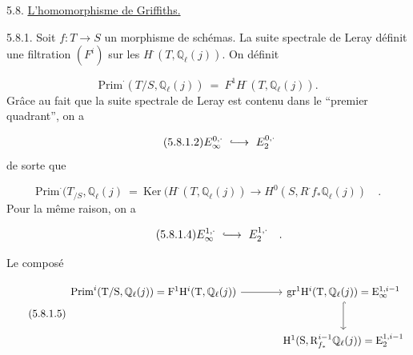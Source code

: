 5.8. \underline{L'homomorphisme de Griffiths.}

5.8.1. Soit $f: T \longrightarrow S$ un morphisme de schémas. La suite spectrale de Leray définit une filtration $(F^i)$ sur les $H^{\cdot}(T,\mathbb{Q}_\ell(j))$. On définit

\begin{equation}\tag{5.8.1.1}
\mathrm{Prim}^{\cdot}(T/S,\mathbb{Q}_\ell(j)) \ = \ F^1H^{\cdot}(T,\mathbb{Q}_\ell(j)).
\end{equation}
Grâce au fait que la suite spectrale de Leray est contenu dans le ``premier quadrant'', on a

\begin{equation}\tag{5.8.1.2}
E_\infty^{0,\cdot} \ \lhook\joinrel\longrightarrow \ E_2^{0,\cdot}
\end{equation}
de sorte que

\begin{equation}\tag{5.8.1.3}
\mathrm{Prim}^{\cdot}(T_{/S},\mathbb{Q}_\ell(j) \ = \ \mathrm{Ker} \ (H^{\cdot}(T,\mathbb{Q}_\ell(j)) \longrightarrow H^0(S,R^{\cdot}f_*\mathbb{Q}_\ell(j)) \quad .
\end{equation}
Pour la même raison, on a

\begin{equation}\tag{5.8.1.4}
E_\infty^{1,\cdot} \ \lhook\joinrel\longrightarrow \ E_2^{1,\cdot} \quad .
\end{equation}


%
Le composé

\begin{equation}\tag{5.8.1.5}
\begin{tikzcd}[column sep=large, row sep=large]
\mathrm{Prim}^i(\mathrm{T} /\mathrm{S},\mathbb{Q}_\ell(j)) = \mathrm{F}^1\mathrm{H}^i(\mathrm{T},\mathbb{Q}_\ell(j)) \arrow[r] & \mathrm{gr}^1\mathrm{H}^i(\mathrm{T},\mathbb{Q}_\ell(j)) = \mathrm{E}_\infty^{1,i-1} \arrow[d, hook] \\
{} & \mathrm{H}^1(\mathrm{S},\mathrm{R}^{i-1}_{f_*}\mathbb{Q}_\ell(j)) = \mathrm{E}_2^{1,i-1}
\end{tikzcd}
\end{equation}

